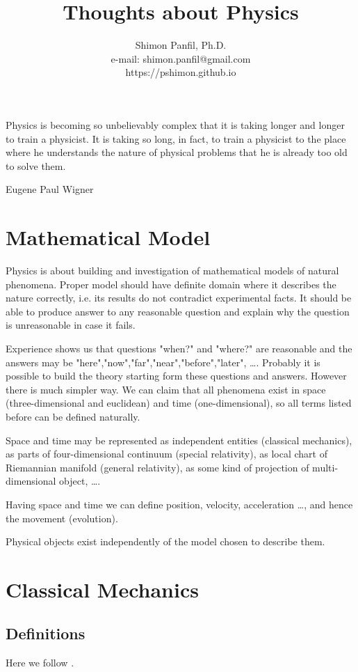 \documentclass[11pt]{report}
\title{Thoughts about Physics}
\author{Shimon Panfil, Ph.D.\\
e-mail: shimon.panfil@gmail.com\\
https://pshimon.github.io}
\begin{document}
                        
\maketitle
\epigraph{Physics is becoming so unbelievably complex that it is taking longer
and longer to train a physicist. It is taking so long, in fact, to train a 
physicist to the place where he understands the nature of physical problems that 
he is already too old to solve them.}{Eugene Paul Wigner}
\tableofcontents                        
\chapter{Mathematical Model }
\label {math-mod}
Physics is about building and investigation of mathematical models  of natural phenomena. 
Proper model should have definite domain where it describes the nature correctly, i.e.
its results do not contradict experimental facts. It should be able to produce answer
to any reasonable question and explain why the question is unreasonable in case it fails.

Experience shows us that questions "when?" and "where?" are reasonable and the answers may be
"here","now","far","near","before","later", \ldots . Probably it is possible to build 
the theory starting form these questions and answers. However there is much simpler way.
We can claim that all phenomena exist in space (three-dimensional and euclidean) 
and time (one-dimensional), so all terms listed before can be defined naturally.

Space and time may be represented as independent entities (classical mechanics), as parts of 
four-dimensional continuum (special relativity), as local chart
of Riemannian manifold (general relativity), as some kind of projection
of multi-dimensional object, \ldots .

Having space and time we can define position, velocity, acceleration \ldots, and hence
the movement (evolution).

Physical objects exist independently of the model chosen to describe them. 
\chapter{Classical Mechanics}
\label{class-mech}
\section{Definitions}
\label{class-mech-def}
Here we follow \cite{arnold-cm}.
\end{document}
